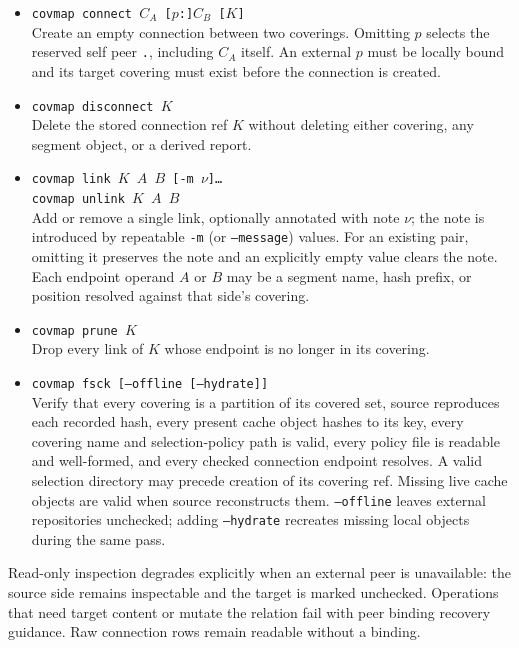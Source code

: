 \documentclass[11pt,a4paper]{article}
\begin{document}
\begin{itemize}[leftmargin=2em,itemsep=2pt]
      crash-resumable journal. The reserved alias \texttt{.} is implicit and
      cannot be bound or unbound.
\item \texttt{covmap connect $C_A$ [$p$:]$C_B$ [$K$]}\\
      Create an empty connection between two coverings. Omitting $p$ selects
      the reserved self peer \texttt{.}, including $C_A$ itself. An external
      $p$ must be locally bound and its target covering must exist before the
      connection is created.
\item \texttt{covmap disconnect $K$}\\
      Delete the stored connection ref $K$ without deleting either covering,
      any segment object, or a derived report.
\item \texttt{covmap link $K$ $A$ $B$ [-m $\nu$]\ldots}\\
      \texttt{covmap unlink $K$ $A$ $B$}\\
      Add or remove a single link, optionally annotated with note $\nu$;
      the note is introduced by repeatable \texttt{-m} (or
      \texttt{--message}) values.
      For an existing pair, omitting it preserves the note and an explicitly
      empty value clears the note.
      Each endpoint operand $A$ or $B$ may be a segment name, hash prefix,
      or position resolved against that side's covering.
\item \texttt{covmap prune $K$}\\
      Drop every link of $K$ whose endpoint is no longer in its
      covering.
\item \texttt{covmap fsck [--offline [--hydrate]]}\\
      Verify that every covering is a partition of its covered set, source
      reproduces each recorded hash, every present cache object hashes to its
      key, every covering name and selection-policy path is valid, every
      policy file is readable and well-formed, and every checked connection
      endpoint resolves. A valid selection directory may precede creation of
      its covering ref. Missing live cache objects are valid when source
      reconstructs them. \texttt{--offline} leaves external repositories
      unchecked; adding \texttt{--hydrate} recreates missing local objects
      during the same pass.
\end{itemize}

Read-only inspection degrades explicitly when an external peer is unavailable:
the source side remains inspectable and the target is marked unchecked.
Operations that need target content or mutate the relation fail with peer
binding recovery guidance. Raw connection rows remain readable without a
binding.
\end{document}
